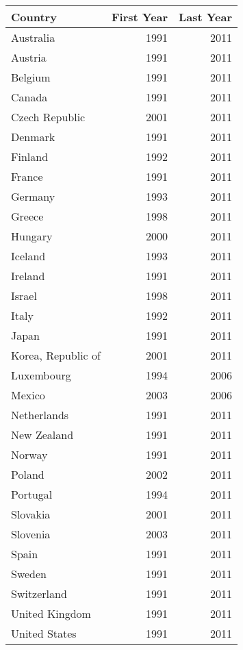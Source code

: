 \begingroup\tiny
\begin{tabular}{lrr}
  \hline
Country & First Year & Last Year \\ 
  \hline
Australia & 1991 & 2011 \\ 
  Austria & 1991 & 2011 \\ 
  Belgium & 1991 & 2011 \\ 
  Canada & 1991 & 2011 \\ 
  Czech Republic & 2001 & 2011 \\ 
  Denmark & 1991 & 2011 \\ 
  Finland & 1992 & 2011 \\ 
  France & 1991 & 2011 \\ 
  Germany & 1993 & 2011 \\ 
  Greece & 1998 & 2011 \\ 
  Hungary & 2000 & 2011 \\ 
  Iceland & 1993 & 2011 \\ 
  Ireland & 1991 & 2011 \\ 
  Israel & 1998 & 2011 \\ 
  Italy & 1992 & 2011 \\ 
  Japan & 1991 & 2011 \\ 
  Korea, Republic of & 2001 & 2011 \\ 
  Luxembourg & 1994 & 2006 \\ 
  Mexico & 2003 & 2006 \\ 
  Netherlands & 1991 & 2011 \\ 
  New Zealand & 1991 & 2011 \\ 
  Norway & 1991 & 2011 \\ 
  Poland & 2002 & 2011 \\ 
  Portugal & 1994 & 2011 \\ 
  Slovakia & 2001 & 2011 \\ 
  Slovenia & 2003 & 2011 \\ 
  Spain & 1991 & 2011 \\ 
  Sweden & 1991 & 2011 \\ 
  Switzerland & 1991 & 2011 \\ 
  United Kingdom & 1991 & 2011 \\ 
  United States & 1991 & 2011 \\ 
   \hline
\end{tabular}
\endgroup
